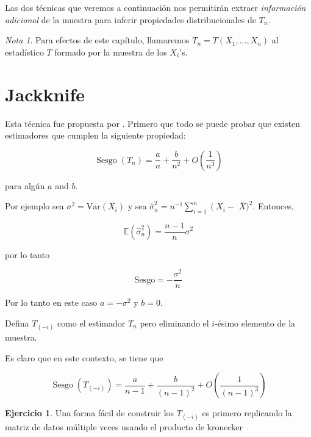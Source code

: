 \documentclass[
  12pt,
]{book}
\theoremstyle{definition}
\theoremstyle{definition}
\theoremstyle{definition}
\newtheorem{exercise}{Ejercicio}[chapter]
\theoremstyle{definition}
\theoremstyle{remark}
\newtheorem*{remark}{Nota}
\begin{document}
Las dos técnicas que veremos a continuación nos permitirán extraer
\emph{información adicional} de la muestra para inferir propiedades distribucionales de \(T_n\).

\begin{remark}
Para efectos de este capítulo, llamaremos \(T_{n}=T\left(  X_{1},\ldots,X_{n}\right)\) al estadístico \(T\) formado por la muestra de
los \(X_{i}\)'s.
\end{remark}

\hypertarget{jackknife}{%
\section{Jackknife}\label{jackknife}}

Esta técnica fue propuesta por \autocite{Quenouille1949}. Primero que todo se puede probar que existen estimadores que cumplen la siguiente propiedad:

\begin{equation}
\operatorname{Sesgo}\left(T_{n}\right)=\frac{a}{n}+\frac{b}{n^{2}}+O\left(\frac{1}{n^{3}}\right)
\end{equation}

para algún \(a\) and \(b\).

Por ejemplo sea \(\sigma^{2}=\mathrm{Var}\left(X_{i}\right)\) y sea
\(\widehat{\sigma}_{n}^{2}=n^{-1} \sum_{i=1}^{n}\left(X_{i}-\right.\)
\(\bar{X})^{2}\). Entonces,

\begin{equation*}
\mathbb{E}\left(\widehat{\sigma}_{n}^{2}\right)=
\frac{n-1}{n}\sigma^{2}
\end{equation*}

por lo tanto

\begin{equation*}
\mathrm{Sesgo} = -\frac{\sigma^{2}}{n}
\end{equation*}

Por lo tanto en este caso \(a=-\sigma^{2}\) y \(b=0\).

Defina \(T_{(-i)}\) como el estimador \(T_{n}\) pero eliminando el
\(i\)-ésimo elemento de la muestra.

Es claro que en este contexto, se tiene que

\begin{equation}
\operatorname{Sesgo}\left(T_{(-i)}\right)=\frac{a}{n-1}+\frac{b}{(n-1)^{2}}+O\left(\frac{1}{(n-1)^{3}}\right)
\end{equation}

\begin{exercise}
\protect\hypertarget{exr:unnamed-chunk-70}{}\label{exr:unnamed-chunk-70}Una forma fácil de construir los \(T_{(-i)}\) es primero replicando
la matriz de datos múltiple veces usando el producto de kronecker
\end{exercise}
\end{document}
